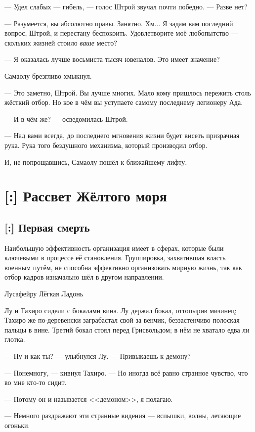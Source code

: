 --- Удел слабых --- гибель, --- голос Штрой звучал почти победно.
--- Разве нет?

--- Разумеется, вы абсолютно правы.
Занятно.
Хм...
Я задам вам последний вопрос, Штрой, и перестану беспокоить.
Удовлетворите моё любопытство --- скольких жизней стоило \emph{ваше} место?

--- Я оказалась лучше восьмиста тысяч ювеналов.
Это имеет значение?

Самаолу брезгливо хмыкнул.

--- Это заметно, Штрой.
Вы лучше многих.
Мало кому пришлось пережить столь жёсткий отбор.
Но кое в чём вы уступаете самому последнему легионеру Ада.

--- И в чём же? --- осведомилась Штрой.

--- Над вами всегда, до последнего мгновения жизни будет висеть призрачная рука.
Рука того бездушного механизма, который производил отбор.

И, не попрощавшись, Самаолу пошёл к ближайшему лифту.

\chapter{[:] Рассвет Жёлтого моря}

\section{[:] Первая смерть}

\epigraph
{Наибольшую эффективность организация имеет в сферах, которые были ключевыми в процессе её становления.
Группировка, захватившая власть военным путём, не способна эффективно организовать мирную жизнь, так как отбор кадров изначально шёл в другом направлении.}
{Лусафейру Лёгкая Ладонь}

Лу и Тахиро сидели с бокалами вина.
Лу держал бокал, оттопырив мизинец; Тахиро же по-деревенски заграбастал свой за венчик, беззастенчиво полоская пальцы в вине.
Третий бокал стоял перед Грисвольдом;
в нём не хватало едва ли глотка.

--- Ну и как ты? --- улыбнулся Лу.
--- Привыкаешь к демону?

--- Понемногу, --- кивнул Тахиро.
--- Но иногда всё равно странное чувство, что во мне кто-то сидит.

--- Потому он и называется <<демоном>>, я полагаю.

--- Немного раздражают эти странные видения --- вспышки, волны, летающие огоньки.

